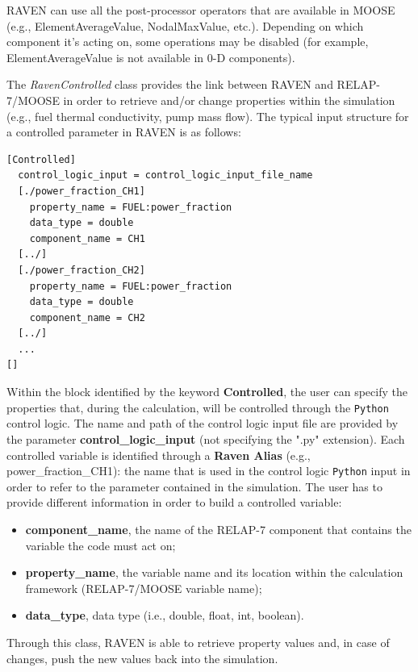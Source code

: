\documentclass{mc2013}
\begin{document}
RAVEN can use all the post-processor operators that are available in MOOSE (e.g., ElementAverageValue, NodalMaxValue, etc.). Depending on which component it's acting on, some operations may be disabled (for example,  ElementAverageValue is not available in 0-D components).

The \emph{RavenControlled} class provides the link between RAVEN and RELAP-7/MOOSE in order to retrieve and/or change properties within the simulation (e.g., fuel thermal conductivity, pump mass flow). The typical input structure for a controlled parameter in RAVEN is as follows:
\begin{lstlisting}
[Controlled]
  control_logic_input = control_logic_input_file_name
  [./power_fraction_CH1]
    property_name = FUEL:power_fraction
    data_type = double
    component_name = CH1
  [../]
  [./power_fraction_CH2]
    property_name = FUEL:power_fraction
    data_type = double
    component_name = CH2
  [../]
  ...
[]
\end{lstlisting}
Within the block identified by the keyword \textbf{Controlled}, the user can specify the properties that, during the calculation, will be controlled through the \verb!Python! control logic. The name and path of the control logic input file are provided by the parameter  \textbf{control\_logic\_input} (not specifying the ".py" extension). Each controlled variable is identified through a \textbf{Raven Alias} (e.g., power\_fraction\_CH1): the name that is used in the control logic \verb!Python! input in order to refer to the parameter contained in the simulation.
The user has to provide different information in order to build a controlled variable:
\begin{itemize}
  \item \textbf{component\_name}, the name of the RELAP-7 component that contains the variable the code must act on;
  \item \textbf{property\_name}, the variable name and its location within the calculation framework (RELAP-7/MOOSE variable name);
  \item \textbf{data\_type}, data type (i.e., double, float, int, boolean).
\end{itemize}
Through this class, RAVEN is able to retrieve property values and, in case of changes, push the new values back into the simulation. 
\end{document}
